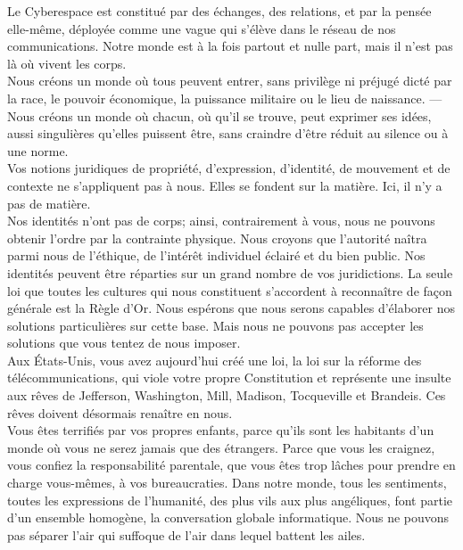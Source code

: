 \documentclass[11pt,twoside,a4paper]{book}
\begin{document}
\begin{center}
\begin{minipage}[ht]{0.95\textwidth}
	Le Cyberespace est constitu{\'e} par des {\'e}changes, des relations, et par la pens{\'e}e elle-m{\^e}me, d{\'e}ploy{\'e}e comme une vague qui s'{\'e}l{\`e}ve dans le r{\'e}seau de nos communications. Notre monde est {\`a} la fois partout et nulle part, mais il n'est pas l{\`a} o{\`u} vivent les corps. ~\\
	
	Nous cr{\'e}ons un monde o{\`u} tous peuvent entrer, sans privil{\`e}ge ni pr{\'e}jug{\'e} dict{\'e} par la race, le pouvoir {\'e}conomique, la puissance militaire ou le lieu de naissance. --- Nous cr{\'e}ons un monde o{\`u} chacun, o{\`u} qu'il se trouve, peut exprimer ses id{\'e}es, aussi singuli{\`e}res qu'elles puissent {\^e}tre, sans craindre d'{\^e}tre r{\'e}duit au silence ou {\`a} une norme. ~\\
	
	Vos notions juridiques de propri{\'e}t{\'e}, d'expression, d'identit{\'e}, de mouvement et de contexte ne s'appliquent pas {\`a} nous. Elles se fondent sur la mati{\`e}re. Ici, il n'y a pas de mati{\`e}re. ~\\
	
	Nos identit{\'e}s n'ont pas de corps; ainsi, contrairement {\`a} vous, nous ne pouvons obtenir l'ordre par la contrainte physique. Nous croyons que l'autorit{\'e} na{\^i}tra parmi nous de l'{\'e}thique, de l'int{\'e}r{\^e}t individuel {\'e}clair{\'e} et du bien public. Nos identit{\'e}s peuvent {\^e}tre r{\'e}parties sur un grand nombre de vos juridictions. La seule loi que toutes les cultures qui nous constituent s'accordent {\`a} reconna{\^i}tre de fa\c{c}on g{\'e}n{\'e}rale est la R{\`e}gle d'Or. Nous esp{\'e}rons que nous serons capables d'{\'e}laborer nos solutions particuli{\`e}res sur cette base. Mais nous ne pouvons pas accepter les solutions que vous tentez de nous imposer. ~\\
	
	Aux {\'E}tats-Unis, vous avez aujourd'hui cr{\'e}{\'e} une loi, la loi sur la r{\'e}forme des t{\'e}l{\'e}communications, qui viole votre propre Constitution et repr{\'e}sente une insulte aux r{\^e}ves de Jefferson, Washington, Mill, Madison, Tocqueville et Brandeis. Ces r{\^e}ves doivent d{\'e}sormais rena{\^i}tre en nous. ~\\
	
	Vous {\^e}tes terrifi{\'e}s par vos propres enfants, parce qu'ils sont les habitants d'un monde o{\`u} vous ne serez jamais que des {\'e}trangers. Parce que vous les craignez, vous confiez la responsabilit{\'e} parentale, que vous {\^e}tes trop l{\^a}ches pour prendre en charge vous-m{\^e}mes, {\`a} vos bureaucraties. Dans notre monde, tous les sentiments, toutes les expressions de l'humanit{\'e}, des plus vils aux plus ang{\'e}liques, font partie d'un ensemble homog{\`e}ne, la conversation globale informatique. Nous ne pouvons pas s{\'e}parer l'air qui suffoque de l'air dans lequel battent les ailes. ~\\
	

\end{minipage}
\end{center}
\end{document}
